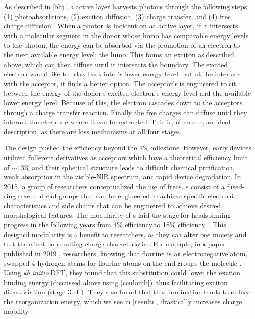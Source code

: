As described in \ref{bhj}, a  active layer harvests photons through the following 
steps: (1) photoabsorbtions, 
(2) exciton diffusion, (3) charge transfer, and (4) free charge diffusion \cite{Fusella2019}. 
When a photon is incident on
an  active layer, if it intersects with a molecular segment in the donor whose 
\gls{homo} has comparable energy levels to the photon, 
the energy can be absorbed via the promotion of
an electron to the next available energy level; the \gls{lumo}.
This forms an exciton as
described above, which can then diffuse until it intersects the boundary. 
The excited electron would like to relax
back into is lower energy level, but at the interface with the acceptor, it finds a better option. 
The acceptor's  is engineered to sit between the energy of the donor's excited electron's energy level and the
available lower energy level. Because of this, the electron cascades down to the acceptors  through a charge
transfer reaction. Finally the free charges can diffuse until they interact the electrode where it can be
extracted. This is, of course, an ideal description, as there are loss mechanisms at all four stages. 

The  design pushed the efficiency beyond the 1\% milestone. However, early  devices utilized
fullerene derivatives as acceptors which have a theoretical efficiency limit of $\sim13\%$ \cite{Scharber2016}
and their spherical
structure leads to difficult chemical purification, weak absorption in the visible-NIR spectrum, and rapid
device degradation. In 2015, a group of researchers conceptualized the use of
\gls{frea}s. s consist of
a fused-ring core and end groups that can be engineered to achieve specific electronic characteristics and side
chains that can be engineered to achieve desired morphological features. The modularity of s
laid the stage for headspinning progress in the following years from 4\% efficiency to 18\% 
efficiency~\cite{Wang2021a}. 
This designed modularity is a benefit to researchers, as they can alter one moiety and test
the effect on resulting charge characteristics. For example, in a paper published in 2019 \cite{Benatto2019},
researchers, knowing that flourine is an electronegative atom, swapped 4 hydrogen atoms for flourine atoms on
the end groups the  molecule . Using \textit{ab initio} DFT, they found 
that this substitution could lower the exciton
binding energy (discussed above using \autoref{coulomb}), thus facilitating exciton disassociation (stage 3 of
). They also found
that this flourination tends to reduce the reorganization energy, which we see
in \autoref{results}, drastically increases charge mobility.%

